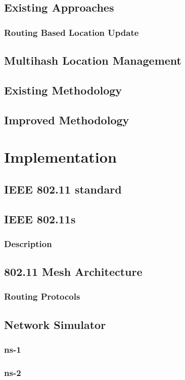 \documentclass[11pt,a4paper]{report}
\begin{document}
\section{Existing Approaches}
\subsection{Routing Based Location Update}
\section{Multihash Location Management}
\section{Existing Methodology }
\section{Improved Methodology}

\chapter{Implementation}
\section{IEEE 802.11 standard}
\section{IEEE 802.11s}
\subsection*{Description}
\section{802.11 Mesh Architecture}
\subsection*{Routing Protocols}
\section{Network Simulator}
\subsection{ns-1}
\subsection{ns-2}
\end{document}
